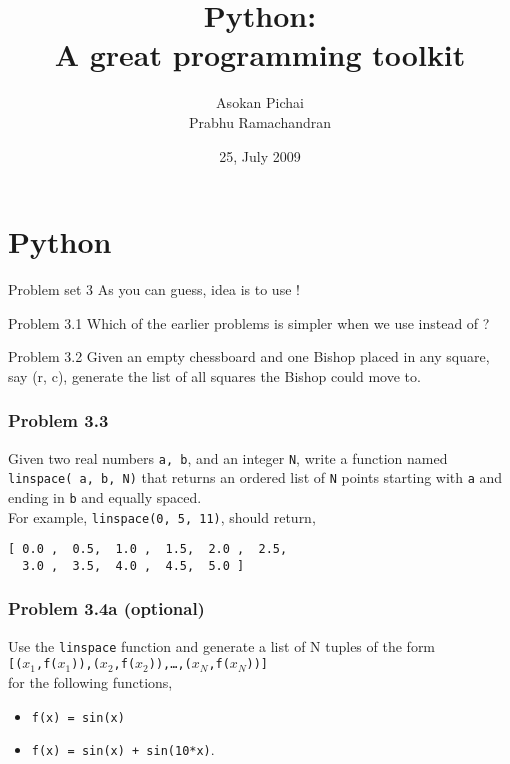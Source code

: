 \documentclass[14pt,compress]{beamer}
\title[Basic Python]{Python:\\A great programming toolkit}
\author[Asokan \& Prabhu] {Asokan Pichai\\Prabhu Ramachandran}
\institute[IIT Bombay] {Department of Aerospace Engineering\\IIT Bombay}
\date[] {25, July 2009}
\newcommand{\typ}[1]{\texttt{#1}}
\newcommand{\kwrd}[1]{ \texttt{\textbf{\color{blue}{#1}}}  }
\begin{document}
\begin{frame}
  \titlepage
\end{frame}

\section{Python}

\begin{frame}
  {Problem set 3}
  As you can guess, idea is to use \kwrd{for}!
\end{frame}

\begin{frame}{Problem 3.1}
  Which of the earlier problems is simpler when we use \kwrd{for} instead of \kwrd{while}? 
\end{frame}

\begin{frame}{Problem 3.2}
  Given an empty chessboard and one Bishop placed in any square, say (r, c), generate the list of all squares the Bishop could move to.
\end{frame}

\begin{frame}[fragile]
  \frametitle{Problem 3.3}

  Given two real numbers \typ{a, b}, and an integer \typ{N}, write a
  function named \typ{linspace( a, b, N)} that returns an ordered list
  of \typ{N} points starting with \typ{a} and ending in \typ{b} and
  equally spaced.\\

  For example, \typ{linspace(0, 5, 11)}, should return, \\
\begin{lstlisting}
[ 0.0 ,  0.5,  1.0 ,  1.5,  2.0 ,  2.5,  
  3.0 ,  3.5,  4.0 ,  4.5,  5.0 ]
\end{lstlisting}
\end{frame}

\begin{frame}[fragile]
  \frametitle{Problem 3.4a (optional)}

Use the \typ{linspace} function and generate a list of N tuples of the form\\
\typ{[($x_1$,f($x_1$)),($x_2$,f($x_2$)),\ldots,($x_N$,f($x_N$))]}\\for the following functions,\begin{itemize}
  \item \typ{f(x) = sin(x)}
  \item \typ{f(x) = sin(x) + sin(10*x)}.
\end{itemize}
\end{frame}
\end{document}
